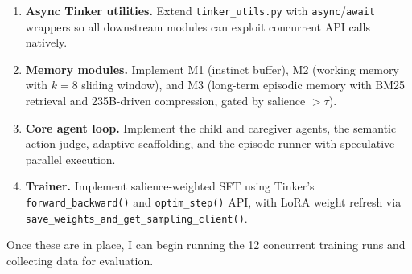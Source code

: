 \documentclass[11pt]{article}
\begin{document}
\begin{enumerate}
    \item \textbf{Async Tinker utilities.} Extend \texttt{tinker\_utils.py} with \texttt{async}/\texttt{await} wrappers so all downstream modules can exploit concurrent API calls natively.
    \item \textbf{Memory modules.} Implement M1 (instinct buffer), M2 (working memory with $k{=}8$ sliding window), and M3 (long-term episodic memory with BM25 retrieval and 235B-driven compression, gated by salience $> \tau$).
    \item \textbf{Core agent loop.} Implement the child and caregiver agents, the semantic action judge, adaptive scaffolding, and the episode runner with speculative parallel execution.
    \item \textbf{Trainer.} Implement salience-weighted SFT using Tinker's \texttt{forward\_backward()} and \texttt{optim\_step()} API, with LoRA weight refresh via \texttt{save\_weights\_and\_get\_sampling\_client()}.
\end{enumerate}

Once these are in place, I can begin running the 12 concurrent training runs and collecting data for evaluation.
\end{document}
